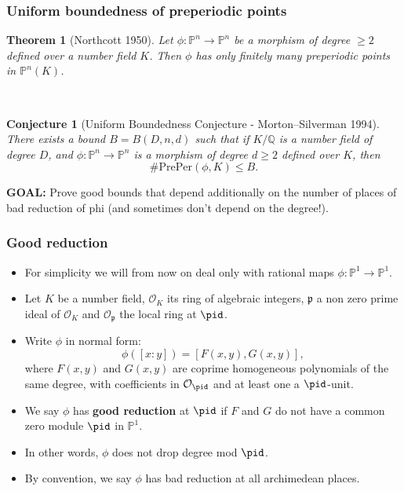 \documentclass{beamer}
\def\PP{{\mathbb P}}
\theoremstyle{thmstyle}
\newtheorem*{mythm}{Theorem}
\theoremstyle{mystyle}
\newtheorem*{conjecture}{Conjecture}
\theoremstyle{qstnstyle}
\begin{document}
\begin{frame}
\frametitle{Uniform boundedness of preperiodic points}
\begin{mythm}[Northcott 1950]
Let $\phi : \PP^n \to \PP^n$ be a morphism of degree $\geq{2}$
defined over a number field $K$. Then $\phi$ has
only finitely many preperiodic points in $\PP^n(K)$.
\end{mythm}

\quad\\

 

\begin{conjecture}[Uniform Boundedness Conjecture - Morton--Silverman
  1994]
There exists a bound $B = B(D,n,d)$ such that if $K/\mathbb{Q}$ is a number field of degree $D$, and $\phi:\mathbb{P}^n\rightarrow\mathbb{P}^n$ is a morphism of degree $d\geq{2}$ defined over $K$, then 
$$\#\text{PrePer}(\phi,K) \leq B.$$
\end{conjecture}

\end{frame}


\begin{frame}

\textbf{GOAL:} Prove good bounds that depend additionally on the number of places of bad reduction of phi   (and sometimes don't depend on the degree!).


\end{frame}

\begin{frame}
\frametitle{Good reduction}

\begin{itemize}
\item For simplicity we will from now on deal only with rational maps $\phi:\mathbb{P}^1\to\mathbb{P}^1$.  
\item Let $K$ be a number field, $\mathcal{O}_K$ its ring of algebraic integers, $\mathfrak{p}$ a non zero prime ideal of $\mathcal{O}_K$
and $\mathcal{O}_{\mathfrak{p}}$ the local ring at $\pid$.  
\item Write $\phi$ in normal form: 
$$\phi([x : y]) = [F(x, y), G(x, y)],$$
where $F(x, y)$ and $G(x, y)$ are coprime
homogeneous polynomials of the same degree, with coefficients in $\mathcal{O}_\pid$ and at least one a $\pid$-unit.  
\item We say $\phi$ has \textbf{good reduction} at $\pid$ if $F$ and $G$ do not have a common zero module $\pid$ in $\mathbb{P}^1$.    
\item In other words, $\phi$ does not drop degree mod $\pid$.   
\item By convention, we say $\phi$ has bad reduction at all archimedean places.
\end{itemize}
\end{frame}
\end{document}
